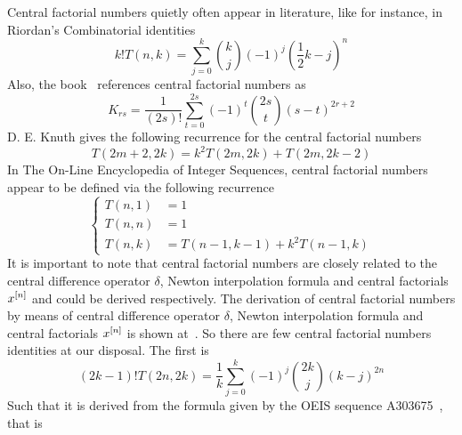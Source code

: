 Central factorial numbers quietly often appear in literature, like for instance, in Riordan's
Combinatorial identities~\cite{riordan1968combinatorial}
\begin{equation}
    k! T(n,k) = \sum_{j=0}^{k} \binom{k}{j} (-1)^{j} \left( \frac{1}{2}k - j \right)^{n}\label{eq:cfn-riordan}
\end{equation}
Also, the book~\cite{carlitz_riordan_1963} references central factorial numbers as
\begin{equation*}
    K_{rs} = \frac{1}{(2s)!} \sum_{t=0}^{2s} (-1)^t \binom{2s}{t} (s-t)^{2r+2}
\end{equation*}
D. E. Knuth gives the following recurrence for the central factorial numbers~\cite{knuth1993johann}
\begin{equation*}
    T(2m+2, 2k) = k^2 T(2m,2k) + T(2m, 2k - 2)
\end{equation*}
In The On-Line Encyclopedia of Integer Sequences, central factorial numbers~\cite{sloane2000centralfactorial}
appear to be defined via the following recurrence
\begin{equation*}
    \begin{cases}
        T(n,1) &=1 \\
        T(n,n) &=1 \\
        T(n,k) &=T(n-1, k-1) + k^2 T(n-1, k)
    \end{cases}
\end{equation*}
It is important to note that central factorial numbers are closely related to the central difference operator $\delta$,
Newton interpolation formula and central factorials $x^{[n]}$ and could be derived respectively.
The derivation of central factorial numbers by means of central difference operator $\delta$,
Newton interpolation formula and central factorials $x^{[n]}$
is shown at~\cite{scheuer2020mathstackexchange}.
So there are few central factorial numbers identities at our disposal.
The first is
\begin{equation}
(2k-1)
    !T(2n,2k) = \frac{1}{k} \sum_{j=0}^{k} (-1)^j \binom{2k}{j} (k-j)^{2n}\label{eq:cfn-identity-1}
\end{equation}
Such that it is derived from the formula given by the OEIS sequence A303675~\cite{kolosov2018coefficients}, that is
